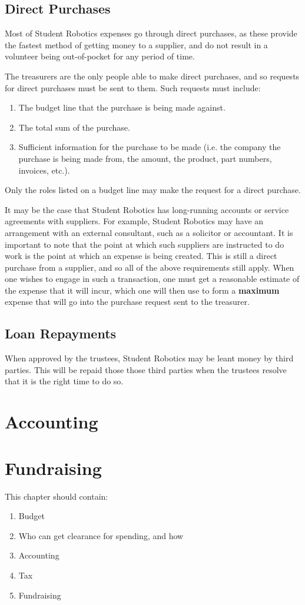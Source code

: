 \subsection{Direct Purchases}
Most of Student Robotics expenses go through direct purchases, as these provide the fastest method of getting money to a supplier, and do not result in a volunteer being out-of-pocket for any period of time.

The treasurers are the only people able to make direct purchases, and so requests for direct purchases must be sent to them.  Such requests must include:
\begin{enumerate}
\item The budget line that the purchase is being made against.
\item The total sum of the purchase.
\item Sufficient information for the purchase to be made (i.e. the company the purchase is being made from, the amount, the product, part numbers, invoices, etc.).
\end{enumerate}

Only the roles listed on a budget line may make the request for a direct purchase.

It may be the case that Student Robotics has long-running accounts or service agreements with suppliers.  For example, Student Robotics may have an arrangement with an external consultant, such as a solicitor or accountant.  It is important to note that the point at which such suppliers are instructed to do work is the point at which an expense is being created.  This is still a direct purchase from a supplier, and so all of the above requirements still apply.  When one wishes to engage in such a transaction, one must get a reasonable estimate of the expense that it will incur, which one will then use to form a \textbf{maximum} expense that will go into the purchase request sent to the treasurer.

\subsection{Loan Repayments}

When approved by the trustees, Student Robotics may be leant money by third parties.  This will be repaid those those third parties when the trustees resolve that it is the right time to do so.

\section{Accounting}

\section{Fundraising}

This chapter should contain:
\begin{enumerate}
\item Budget
\item Who can get clearance for spending, and how
\item Accounting
\item Tax
\item Fundraising
\end{enumerate}
